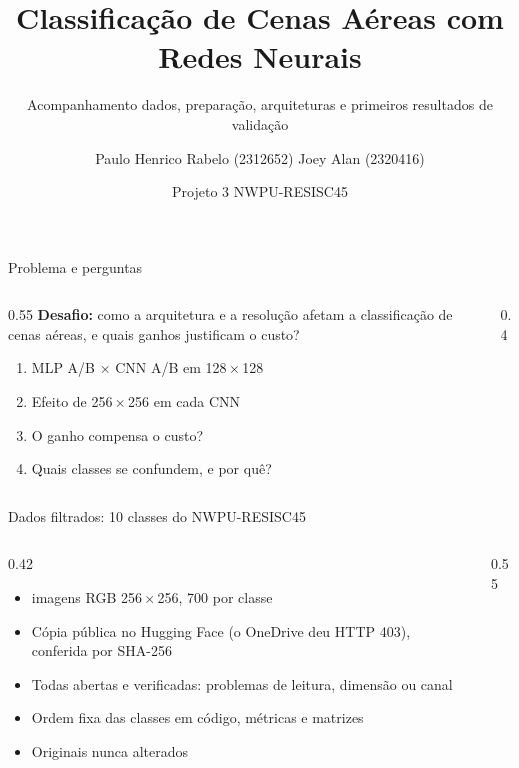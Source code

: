 \documentclass[aspectratio=169,10pt,t]{beamer}
\title{Classificação de Cenas Aéreas com Redes Neurais}
\subtitle{Acompanhamento \textperiodcentered{} dados, preparação, arquiteturas e primeiros resultados de validação}
\author{Paulo Henrico Rabelo (2312652) \quad Joey Alan (2320416)}
\date{Projeto 3 \textperiodcentered{} NWPU-RESISC45 \textperiodcentered{} \repo}
\begin{document}
\begin{frame}[plain]
\titlepage
\end{frame}

\begin{frame}{Problema e perguntas}
\begin{columns}[T]
\begin{column}{0.55\textwidth}
\textbf{Desafio:} como a arquitetura e a resolução afetam a classificação de cenas aéreas, e quais ganhos justificam o custo?
\vskip4mm
\begin{enumerate}
\item MLP A/B × CNN A/B em 128\,×\,128
\item Efeito de 256\,×\,256 em cada CNN
\item O ganho compensa o custo?
\item Quais classes se confundem, e por quê?
\end{enumerate}
\end{column}
\begin{column}{0.4\textwidth}
\vskip3mm
\end{column}
\end{columns}
\end{frame}

\begin{frame}{Dados filtrados: 10 classes do NWPU-RESISC45}
\begin{columns}[T]
\begin{column}{0.42\textwidth}
\begin{itemize}
\item {} imagens RGB 256\,×\,256, 700 por classe
\item Cópia pública no Hugging Face (o OneDrive deu HTTP 403), conferida por SHA-256
\item Todas abertas e verificadas: \textbf{} problemas de leitura, dimensão ou canal
\item Ordem fixa das classes em código, métricas e matrizes
\item Originais nunca alterados
\end{itemize}
\end{column}
\begin{column}{0.55\textwidth}
\centering{}
\end{column}
\end{columns}
\end{frame}
\end{document}

